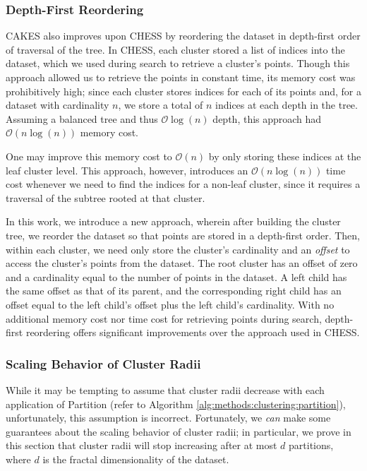 \subsubsection {Depth-First Reordering}
\label{subsubsec:methods:clustering:dataset-depth-first-reordering}

CAKES also improves upon CHESS by reordering the dataset in depth-first order of traversal of the tree.
In CHESS, each cluster stored a list of indices into the dataset, which we used during search to retrieve a cluster's points. 
Though this approach allowed us to retrieve the points in constant time, its memory cost was prohibitively high;
since each cluster stores indices for each of its points and, for a dataset with cardinality $n$, we store a total of $n$ indices at each depth in the tree.
Assuming a balanced tree and thus $\mathcal{O}\log(n)$ depth, this approach had $\mathcal{O}(n\log(n))$ memory cost.

One may improve this memory cost to $\mathcal{O}(n)$ by only storing these indices at the leaf cluster level.
This approach, however, introduces an $\mathcal{O}(n\log(n))$ time cost whenever we need to find the indices for 
a non-leaf cluster, since it requires a traversal of the subtree rooted at that cluster.

In this work, we introduce a new approach, wherein after building the cluster tree, we reorder the dataset so that points are stored in a depth-first order.
Then, within each cluster, we need only store the cluster's cardinality and an \emph{offset} to access the cluster's points from the dataset.
The root cluster has an offset of zero and a cardinality equal to the number of points in the dataset.
A left child has the same offset as that of its parent, and the corresponding right child has an offset equal to the left child's offset plus the left child's cardinality.
With no additional memory cost nor time cost for retrieving points during search, depth-first reordering offers significant improvements over the approach used in CHESS.


\subsubsection {Scaling Behavior of Cluster Radii}
\label{subsubsec:methods:clustering:guaranteed-decrease-in-cluster-radii}

While it may be tempting to assume that cluster radii decrease with each application of Partition (refer to Algorithm \ref{alg:methods:clustering:partition}), unfortunately, this assumption is incorrect. 
Fortunately, we \emph{can} make some guarantees about the scaling behavior of cluster radii;
in particular, we prove in this section that cluster radii will stop increasing after at most $d$ partitions, where $d$ is the fractal dimensionality of the dataset. 

